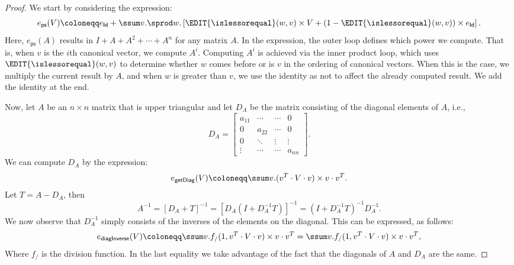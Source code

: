 \begin{proof} We start by considering the expression:
$$
e_{\mathsf{ps}}(V)\coloneqq  e_{\mathsf{Id}} + \ssum v.\sprod w. \left[ \EDIT{\islessorequal}(w,v)\times V + (1 - \EDIT{\islessorequal}(w,v))\times e_{\mathsf{Id}} \right].
$$
Here, $e_{\mathsf{ps}}(A)$ results in $I+A+A^2+\cdots + A^n$ for any matrix $A$. In the expression, the outer loop defines which power we compute. 
That is, when $v$ is the $i$th canonical vector, we compute $A^i$.
Computing $A^i$ is achieved via the inner product loop, which uses $\EDIT{\islessorequal}(w,v)$ to 
determine whether $w$ comes before or is $v$ in the ordering of canonical vectors.
When this is the case, we multiply the current result by $A$, and when $w$ is greater 
than $v$, we use the identity as not to affect the already computed result. We add the identity at the end.

Now, let $A$ be an $n\times n$ matrix that is upper triangular and let $D_A$ be the matrix consisting of the diagonal elements of $A$, i.e.,
\[
D_A = \begin{bmatrix}
    a_{11} & \cdots & \cdots &  0 \\
    0 & a_{22} & \cdots &  0 \\
    0 & \ddots & \vdots & \vdots \\
    \vdots & \cdots& \cdots & a_{nn}
\end{bmatrix}.
\]
We can compute $D_A$ by the expression:
$$
e_{\mathsf{getDiag}}(V) \coloneqq  \ssum v. (v^T\cdot V\cdot v) \times v\cdot v^T.
$$
Let $T=A-D_A$, then
$$
A^{-1}=\left[ D_A+T \right]^{-1}= \left[ D_A\left( I+D_A^{-1}T\right) \right]^{-1} = \left( I+D_A^{-1}T\right)^{-1}D_A^{-1}.
$$
We now observe that $D_{A}^{-1}$ simply consists of the inverses of the elements on the diagonal. This can be expressed, as follows:
$$
e_{\mathsf{diagInverse}}(V)\coloneqq \ssum v. f_{/}(1,v^T\cdot V\cdot v)\times v\cdot v^T=\ssum v. f_{/}(1,v^T\cdot V\cdot v)\times v\cdot v^T,
$$
Where $f_{/}$ is the division function. In the last equality we take advantage of the fact that the diagonals of $A$ and $D_A$ are the same.


\end{proof}
